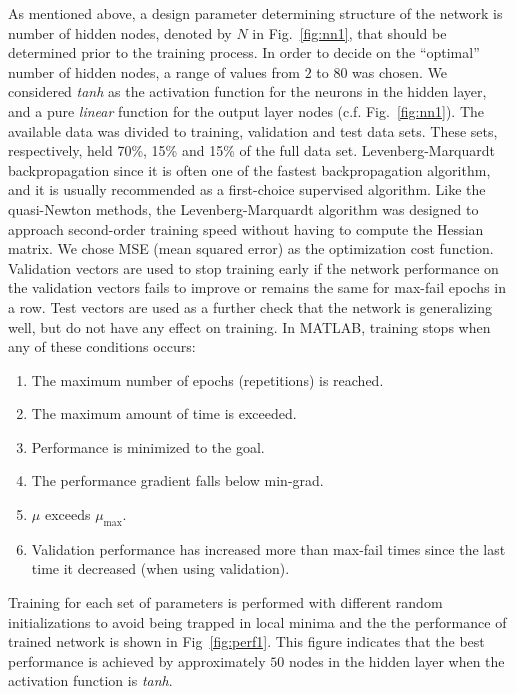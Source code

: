 \documentclass[twocolumn,10pt]{asme2e}
\begin{document}
As mentioned above, a design parameter determining structure of the network is number of hidden nodes, denoted by $N$ in Fig.~\ref{fig:nn1}, that should be determined prior to the training process. In order to decide on the ``optimal'' number of hidden nodes, a range of values from $2$ to $80$ was chosen. We considered \emph{tanh} as the activation function for the neurons in the hidden layer, and a pure \emph{linear} function for the output layer nodes (c.f. Fig.~\ref{fig:nn1}). The available data was divided to training, validation and test data sets. These sets, respectively, held 70\%, 15\% and 15\% of the full data set.
Levenberg-Marquardt backpropagation \cite{hagan1994training} since it is often one of the fastest backpropagation algorithm, and it is usually recommended as a first-choice supervised algorithm.
Like the quasi-Newton methods, the Levenberg-Marquardt algorithm was designed to approach second-order training speed without having to compute the Hessian matrix. 
We chose MSE (mean squared error) as the optimization cost function. Validation vectors are used to stop training early if the network performance on the validation vectors fails to improve or remains the same for max-fail epochs in a row. Test vectors are used as a further check that the network is generalizing well, but do not have any effect on training. In MATLAB, training stops when any of these conditions occurs:
\begin{enumerate}
\item The maximum number of epochs (repetitions) is reached.
\item The maximum amount of time is exceeded.
\item Performance is minimized to the goal.
\item The performance gradient falls below min-grad.
\item $\mu$ exceeds $\mu_{\max}$.
\item Validation performance has increased more than max-fail times since the last time it decreased (when using validation).
\end{enumerate}
Training for each set of parameters is performed with different random initializations to avoid being trapped in local minima and the the performance of trained network is shown in Fig~\ref{fig:perf1}. This figure indicates that the best performance is achieved by approximately $50$ nodes in the hidden layer when the activation function is \textit{tanh}.
\end{document}
